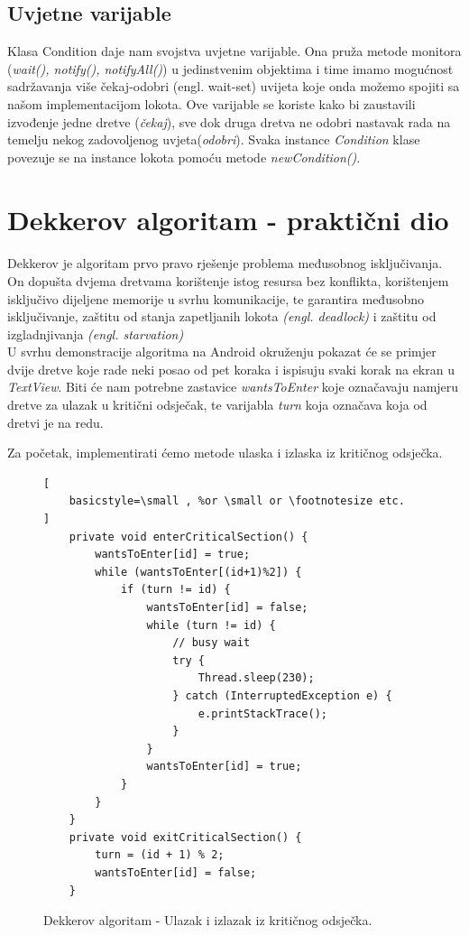 \documentclass[times, utf8, zavrsni]{fer}
\begin{document}
\subsection{Uvjetne varijable}
Klasa Condition daje nam svojstva uvjetne varijable. Ona pruža metode monitora (\textit{wait(), notify(), notifyAll()}) u jedinstvenim objektima i time imamo mogućnost sadržavanja više čekaj-odobri (engl. wait-set) uvijeta koje onda možemo spojiti sa našom implementacijom lokota. 
Ove varijable se koriste kako bi zaustavili izvođenje jedne dretve (\textit{čekaj}), sve dok druga dretva ne odobri nastavak rada na temelju nekog zadovoljenog uvjeta(\textit{odobri}).
Svaka instance \textit{Condition} klase povezuje se na instance lokota pomoću metode \textit{newCondition()}.

\section{Dekkerov algoritam - praktični dio}
\paragraph{}
Dekkerov je algoritam prvo pravo rješenje problema međusobnog isključivanja. On dopušta dvjema dretvama korištenje istog resursa bez konflikta, korištenjem isključivo dijeljene memorije u svrhu komunikacije, te garantira međusobno isključivanje, zaštitu od stanja zapetljanih lokota \textit{(engl. deadlock)} i zaštitu od izgladnjivanja \textit{(engl. starvation)} \\

U svrhu demonstracije algoritma na Android okruženju pokazat će se primjer dvije dretve koje rade neki posao od pet koraka i ispisuju svaki korak na ekran u \textit{TextView}. Biti će nam potrebne zastavice \textit{wantsToEnter} koje označavaju namjeru dretve za ulazak u kritični odsječak, te varijabla \textit{turn} koja označava koja od dretvi je na redu.\newpage

Za početak, implementirati ćemo metode ulaska i izlaska iz kritičnog odsječka.

\begin{figure}[ht!]
\begin{lstlisting}[
    basicstyle=\small , %or \small or \footnotesize etc.
]
    private void enterCriticalSection() {
        wantsToEnter[id] = true;
        while (wantsToEnter[(id+1)%2]) {
            if (turn != id) {
                wantsToEnter[id] = false;
                while (turn != id) {
                    // busy wait
                    try {
                        Thread.sleep(230);
                    } catch (InterruptedException e) {
                        e.printStackTrace();
                    }
                }
                wantsToEnter[id] = true;
            }
        }
    }
    private void exitCriticalSection() {
        turn = (id + 1) % 2;
        wantsToEnter[id] = false;
    }
\end{lstlisting}
\caption{Dekkerov algoritam - Ulazak i izlazak iz kritičnog odsječka.}
\label{overflow}
\end{figure}
\end{document}
